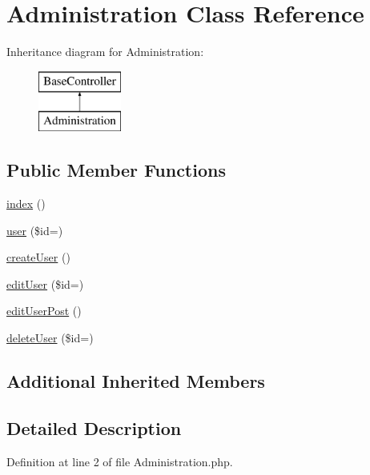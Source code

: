 \hypertarget{class_administration}{}\section{Administration Class Reference}
\label{class_administration}
Inheritance diagram for Administration\+:\begin{figure}[H]
\begin{center}
\leavevmode
\includegraphics[height=2.000000cm]{class_administration}
\end{center}
\end{figure}
\subsection*{Public Member Functions}
\begin{DoxyCompactItemize}
\item 
\hyperlink{class_administration_a149eb92716c1084a935e04a8d95f7347}{index} ()
\item 
\hyperlink{class_administration_a6603546e99f9519b86989be128736ad6}{user} (\$id=\textquotesingle{}\textquotesingle{})
\item 
\hyperlink{class_administration_a967982ee98f05287bbdba812f6016947}{create\+User} ()
\item 
\hyperlink{class_administration_acd3b430aeceba0ebbda62330838d0c0b}{edit\+User} (\$id=\textquotesingle{}\textquotesingle{})
\item 
\hyperlink{class_administration_a445a1f2f42c756bf451de087e36b7193}{edit\+User\+Post} ()
\item 
\hyperlink{class_administration_a934aeeec370d904f3a58bde4d514259d}{delete\+User} (\$id=\textquotesingle{}\textquotesingle{})
\end{DoxyCompactItemize}
\subsection*{Additional Inherited Members}


\subsection{Detailed Description}


Definition at line 2 of file Administration.\+php.



